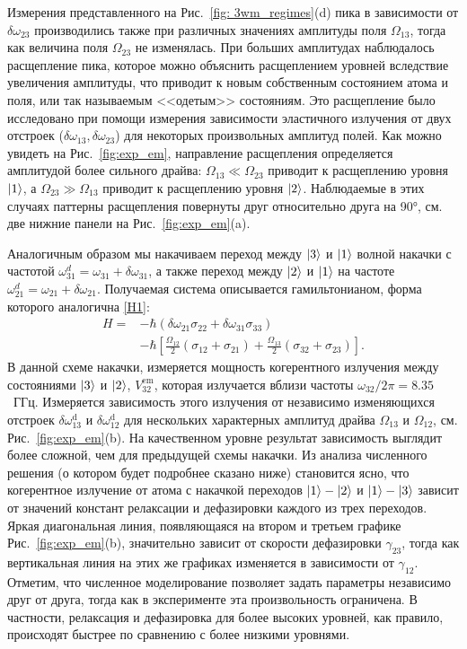 Измерения представленного на Рис.~\ref{fig: 3wm_regimes}(d) пика в зависимости от $\delta\omega_{23}$ производились также при различных значениях амплитуды поля $\Omega_{13}$, тогда как величина поля $\Omega_{23}$ не изменялась. При больших амплитудах наблюдалось расщепление пика, которое можно объяснить расщеплением уровней вследствие увеличения амплитуды, что приводит к новым собственным состоянием атома и поля, или так называемым <<одетым>> состояниям. Это расщепление было исследовано при помощи измерения зависимости эластичного излучения от двух отстроек ($\delta\omega_{13}, \delta\omega_{23}$) для некоторых произвольных амплитуд полей. Как можно увидеть на Рис.~\ref{fig:exp_em}, направление расщепления определяется амплитудой более сильного драйва: $\Omega_{13}\ll\Omega_{23}$ приводит к расщеплению уровня $\ket{1}$, а $\Omega_{23}\gg\Omega_{13}$ приводит к расщеплению уровня $\ket{2}$. Наблюдаемые в этих случаях паттерны расщепления повернуты друг относительно друга на \ang{90}, см. две нижние панели на Рис.~\ref{fig:exp_em}(a).

Аналогичным образом мы накачиваем переход между $\ket{3}$ и $\ket{1}$ волной накачки с частотой $\omega_{31}^{d}=\omega_{31}+\delta\omega_{31}$, а также переход между $
\ket{2}$ и $\ket{1}$ на частоте $\omega_{21}^{d}=\omega_{21}+\delta\omega_{21}$. Получаемая система описывается гамильтонианом, форма которого аналогична \eqref{H1}:
\begin{equation}
	\begin{aligned}
		H={}&-\hbar(\delta\omega_{21}\sigma_{22}+\delta\omega_{31}\sigma_{33})\\
		&-\hbar\left[\frac{\Omega_{12}}{2}(\sigma_{12}+\sigma_{21})+\frac{\Omega_{13}}{2}(\sigma_{32}+\sigma_{23})\right].
	\end{aligned}
\label{H2}
\end{equation}
В данной схеме накачки, измеряется мощность когерентного излучения между состояниями $\ket{3}$ и $\ket{2}$, $V_{32}^{\text{em}}$, которая излучается вблизи частоты $\omega_{32}/2\pi=8.35$~ГГц. Измеряется зависимость этого излучения от независимо изменяющихся отстроек $\delta\omega^{\text{d}}_{13}$ и $\delta\omega^{\text{d}}_{12}$ для нескольких характерных амплитуд драйва $\Omega_13$ и $\Omega_{12}$, см. Рис.~\ref{fig:exp_em}(b). На качественном уровне результат зависимость выглядит более сложной, чем для предыдущей схемы накачки. Из анализа численного решения (о котором будет подробнее сказано ниже) становится ясно, что когерентное излучение от атома с накачкой переходов $\ket{1}-\ket{2}$ и $\ket{1}-\ket{3}$ зависит от значений констант релаксации и дефазировки каждого из трех переходов. Яркая диагональная линия, появляющаяся на втором и третьем графике Рис.~\ref{fig:exp_em}(b), значительно зависит от скорости дефазировки $\gamma_{23}$, тогда как вертикальная линия на этих же графиках изменяется в зависимости от $\gamma_{12}$. Отметим, что численное моделирование позволяет задать параметры независимо друг от друга, тогда как в эксперименте эта произвольность ограничена. В частности, релаксация и дефазировка для более высоких уровней, как правило, происходят быстрее по сравнению с более низкими уровнями. 

